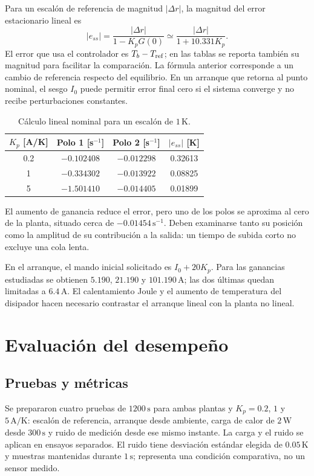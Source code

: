 Para un escalón de referencia de magnitud $|\Delta r|$, la magnitud del error estacionario lineal es
\begin{equation}
 |e_{ss}|=\frac{|\Delta r|}{1-K_pG(0)}\simeq\frac{|\Delta r|}{1+10.331K_p}.
\end{equation}
El error que usa el controlador es $T_b-T_{\rm ref}$; en las tablas se reporta también su magnitud para facilitar la comparación. La fórmula anterior corresponde a un cambio de referencia respecto del equilibrio. En un arranque que retorna al punto nominal, el sesgo $I_0$ puede permitir error final cero si el sistema converge y no recibe perturbaciones constantes.

\begin{table}[!tbp]\centering
\caption{Cálculo lineal nominal para un escalón de $1\,\mathrm K$.}
\label{tab:teoriaP}
\footnotesize
\begin{tabular}{@{}cccc@{}}\toprule
$K_p$ [A/K]&Polo 1 [s$^{-1}$]&Polo 2 [s$^{-1}$]&$|e_{ss}|$ [K]\\\midrule
0.2&$-0.102408$&$-0.012298$&0.32613\\
1&$-0.334302$&$-0.013922$&0.08825\\
5&$-1.501410$&$-0.014405$&0.01899\\\bottomrule
\end{tabular}
\end{table}
El aumento de ganancia reduce el error, pero uno de los polos se aproxima al cero de la planta, situado cerca de $-0.01454\,\mathrm{s}^{-1}$. Deben examinarse tanto su posición como la amplitud de su contribución a la salida: un tiempo de subida corto no excluye una cola lenta.

En el arranque, el mando inicial solicitado es $I_0+20K_p$. Para las ganancias estudiadas se obtienen $5.190$, $21.190$ y $101.190\,\mathrm A$; las dos últimas quedan limitadas a $6.4\,\mathrm A$. El calentamiento Joule y el aumento de temperatura del disipador hacen necesario contrastar el arranque lineal con la planta no lineal.

\section{Evaluación del desempeño}
\subsection{Pruebas y métricas}
Se prepararon cuatro pruebas de $1200\,\mathrm s$ para ambas plantas y $K_p=0.2$, $1$ y $5\,\mathrm{A/K}$: escalón de referencia, arranque desde ambiente, carga de calor de $2\,\mathrm W$ desde $300\,\mathrm s$ y ruido de medición desde ese mismo instante. La carga y el ruido se aplican en ensayos separados. El ruido tiene desviación estándar elegida de $0.05\,\mathrm K$ y muestras mantenidas durante $1\,\mathrm s$; representa una condición comparativa, no un sensor medido.

